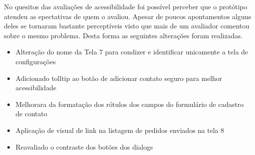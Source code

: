 No quesitos das avaliações de acessibilidade foi possível perceber que o protótipo atendeu as epectativas de quem o avaliou. Apesar de poucos apontamentos alguns deles se tornaram bastante perceptíveis visto que mais de um avaliador comentou sobre o mesmo problema. Desta forma as seguintes alterações foram realizadas.

\begin{itemize}
\item Alteração do nome da Tela 7 para condizer e identificar unicamente a tela de configurações
\item Adicionado tolltip ao botão de adicionar contato seguro para melhor acessibilidade
\item Melhorara da formatação dos rótulos dos campos do formulário de cadastro de contato
\item Aplicação de visual de link na listagem de pedidos enviados na tela 8
\item Reavaliado o contraste dos botões dos dialogs
\end{itemize}

